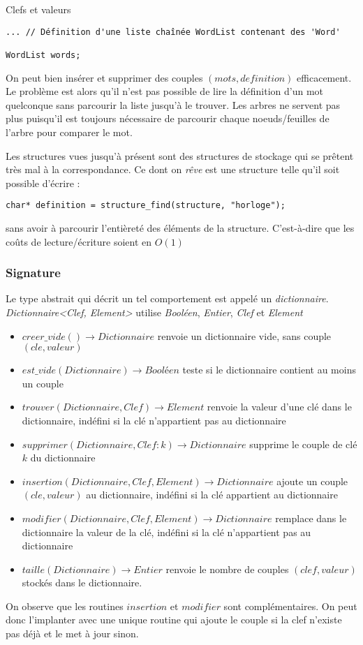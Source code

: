 \documentclass[../../../main.tex]{subfiles}
\begin{document}
\begin{definition}{Clefs et valeurs}
\begin{verbatim}
... // Définition d'une liste chaînée WordList contenant des 'Word'

WordList words;
\end{verbatim}
On peut bien insérer et supprimer des couples $(mots, definition)$ efficacement. Le problème est alors qu'il n'est pas possible de lire la définition d'un mot quelconque sans parcourir la liste jusqu'à le trouver. Les arbres ne servent pas plus puisqu'il est toujours nécessaire de parcourir chaque noeuds/feuilles de l'arbre pour comparer le mot.

Les structures vues jusqu'à présent sont des structures de stockage qui se prêtent très mal à la correspondance. Ce dont on \textit{rêve} est une structure telle qu'il soit possible d'écrire :
\begin{verbatim}
char* definition = structure_find(structure, "horloge");
\end{verbatim}
sans avoir à parcourir l'entièreté des éléments de la structure. C'est-à-dire que les coûts de lecture/écriture soient en $O(1)$
\subsubsection{Signature}
Le type abstrait qui décrit un tel comportement est appelé un \textit{dictionnaire}. \newline
\textit{Dictionnaire\textless Clef, Element\textgreater} utilise \textit{Booléen}, \textit{Entier}, \textit{Clef} et \textit{Element}
\begin{itemize}
	\item $creer\_vide()\rightarrow Dictionnaire$ renvoie un dictionnaire vide, sans couple $(cle, valeur)$
	\item $est\_vide(Dictionnaire)\rightarrow \textit{Booléen}$ teste si le dictionnaire contient au moins un couple
	\item $trouver(Dictionnaire, Clef)\rightarrow Element$ renvoie la valeur d'une clé dans le dictionnaire, indéfini si la clé n'appartient pas au dictionnaire
	\item $supprimer(Dictionnaire, Clef:k)\rightarrow Dictionnaire$ supprime le couple de clé $k$ du dictionnaire
	\item $insertion(Dictionnaire, Clef, Element)\rightarrow Dictionnaire$ ajoute un couple $(cle, valeur)$ au dictionnaire, indéfini si la clé appartient au dictionnaire
	\item $modifier(Dictionnaire, Clef, Element)\rightarrow Dictionnaire$ remplace dans le dictionnaire la valeur de la clé, indéfini si la clé n'appartient pas au dictionnaire
	\item $taille(Dictionnaire)\rightarrow Entier$ renvoie le nombre de couples $(clef, valeur)$ stockés dans le dictionnaire.
\end{itemize}
On observe que les routines $insertion$ et $modifier$ sont complémentaires. On peut donc l'implanter avec une unique routine qui ajoute le couple si la clef n'existe pas déjà et le met à jour sinon.


\end{definition}
\end{document}
